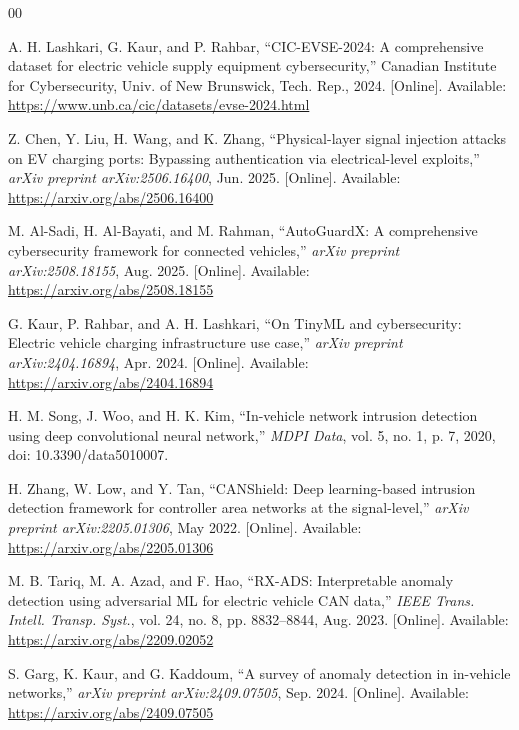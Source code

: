 \documentclass[conference]{IEEEtran}
\begin{document}
\begin{thebibliography}{00}

A. H. Lashkari, G. Kaur, and P. Rahbar, ``CIC-EVSE-2024: A comprehensive dataset for electric vehicle supply equipment cybersecurity,'' Canadian Institute for Cybersecurity, Univ. of New Brunswick, Tech. Rep., 2024. [Online]. Available: \url{https://www.unb.ca/cic/datasets/evse-2024.html}

Z. Chen, Y. Liu, H. Wang, and K. Zhang, ``Physical-layer signal injection attacks on EV charging ports: Bypassing authentication via electrical-level exploits,'' \textit{arXiv preprint arXiv:2506.16400}, Jun. 2025. [Online]. Available: \url{https://arxiv.org/abs/2506.16400}

M. Al-Sadi, H. Al-Bayati, and M. Rahman, ``AutoGuardX: A comprehensive cybersecurity framework for connected vehicles,'' \textit{arXiv preprint arXiv:2508.18155}, Aug. 2025. [Online]. Available: \url{https://arxiv.org/abs/2508.18155}

G. Kaur, P. Rahbar, and A. H. Lashkari, ``On TinyML and cybersecurity: Electric vehicle charging infrastructure use case,'' \textit{arXiv preprint arXiv:2404.16894}, Apr. 2024. [Online]. Available: \url{https://arxiv.org/abs/2404.16894}

H. M. Song, J. Woo, and H. K. Kim, ``In-vehicle network intrusion detection using deep convolutional neural network,'' \textit{MDPI Data}, vol. 5, no. 1, p. 7, 2020, doi: 10.3390/data5010007.

H. Zhang, W. Low, and Y. Tan, ``CANShield: Deep learning-based intrusion detection framework for controller area networks at the signal-level,'' \textit{arXiv preprint arXiv:2205.01306}, May 2022. [Online]. Available: \url{https://arxiv.org/abs/2205.01306}

M. B. Tariq, M. A. Azad, and F. Hao, ``RX-ADS: Interpretable anomaly detection using adversarial ML for electric vehicle CAN data,'' \textit{IEEE Trans. Intell. Transp. Syst.}, vol. 24, no. 8, pp. 8832--8844, Aug. 2023. [Online]. Available: \url{https://arxiv.org/abs/2209.02052}

S. Garg, K. Kaur, and G. Kaddoum, ``A survey of anomaly detection in in-vehicle networks,'' \textit{arXiv preprint arXiv:2409.07505}, Sep. 2024. [Online]. Available: \url{https://arxiv.org/abs/2409.07505}


\end{thebibliography}
\end{document}
